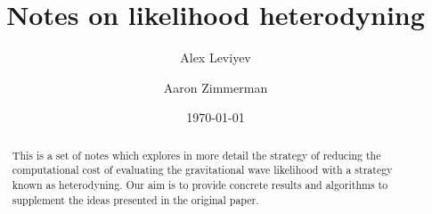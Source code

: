\documentclass[10]{article}
\theoremstyle{definition}
\theoremstyle{plain}
\theoremstyle{remark}
\begin{document}
\title{Notes on likelihood heterodyning}

\author[1]{Alex Leviyev}
\author[1]{Aaron Zimmerman}
\date{\today}
\maketitle

\begin{abstract}
This is a set of notes which explores in more detail the strategy of reducing the computational cost of evaluating the gravitational wave likelihood with a strategy known as heterodyning.
Our aim is to provide concrete results and algorithms to supplement the ideas presented in the original paper.



\end{abstract}

% 
% 
% 
% 
% 

\appendix



% 
\end{document}
